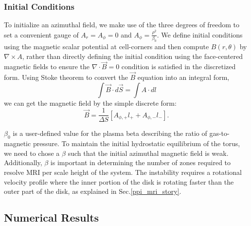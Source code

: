 \documentclass[iop,revtex4]{emulateapj}
\begin{document}
\subsubsection{Initial Conditions}
	To initialize an azimuthal field, we make use of the three degrees of freedom to set a convenient gauge of $A_r = A_\phi = 0$ and $A_\phi = \frac{\rho^2}{\beta_0}$. We define initial conditions using the magnetic scalar potential at cell-corners and then compute $B(r,\theta)$ by $\nabla \times A$, rather than directly defining the initial condition using the face-centered magnetic fields to ensure the $\nabla \cdot \vec{B}=0$ condition is satisfied in the discretized form. Using Stoke theorem to convert the $\vec{B}$ equation into an integral form,
\begin{equation}
\int \vec{B} \cdot d\vec{S}  = \int A\cdot dl 
\end{equation}
we can get the magnetic field by the simple discrete form:
\begin{equation}
\vec{B}=\frac{1}{\Delta S}[A_{\phi,+} l_+ +A_{\phi,-} l_-] .
\end{equation}
	\par $\beta_0$ is a user-defined value for the plasma beta describing the ratio of gas-to-magnetic pressure. To maintain the initial hydrostatic equilibrium of the torus, we need to chose a $\beta$ such that the initial azimuthal magnetic field is weak.
Additionally, $\beta$ is important in determining the number of zones required to resolve MRI per scale height of the system. The instability requires a rotational velocity profile where the inner portion of the disk is rotating faster than the outer part of the disk, as explained in Sec.\ref{ppi_mri_story}.
\subsection{Numerical Results}
\end{document}
